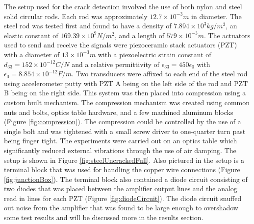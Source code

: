 The setup used for the crack detection involved the use of both nylon and steel solid circular rods. Each rod was approximately $12.7 \times 10^{-3} m$ in diameter. The steel rod was tested first and found to have a density of $7.894 \times 10^3 kg/m^3$, an elastic constant of $169.39 \times 10^9 N/m^2$, and a length of $579 \times 10^{-3} m$. The actuators used to send and receive the signals were piezoceramic stack actuators (PZT) with a diameter of $13 \times 10^{-3} m$ with a piezoelectric strain constant of $d_{33} = 152 \times 10^{-12} C/N$ and a relative permittivity of $\epsilon _{33} = 450 \epsilon _0$ with $\epsilon _0 = 8.854 \times 10 ^{-12} F/m$. Two transducers were affixed to each end of the steel rod using accelerometer putty with PZT A being on the left side of the rod and PZT B being on the right side. This system was then placed into compression using a custom built mechanism. The compression mechanism was created using common nuts and bolts, optics table hardware, and a few machined aluminum blocks (Figure \ref{fig:compression}). The compression could be controlled by the use of a single bolt and was tightened with a small screw driver to one-quarter turn past being finger tight. The experiments were carried out on an optics table which significantly reduced external vibrations through the use of air damping. The setup is shown in Figure \ref{fig:steelUncrackedFull}. Also pictured in the setup is a terminal block that was used for handling the copper wire connections (Figure \ref{fig:junctionBox}). The terminal block also contained a diode circuit consisting of two diodes that was placed between the amplifier output lines and the analog read in lines for each PZT (Figure \ref{fig:diodeCircuit}). The diode circuit snuffed out noise from the amplifier that was found to be large enough to overshadow some test results and will be discussed more in the results section.

